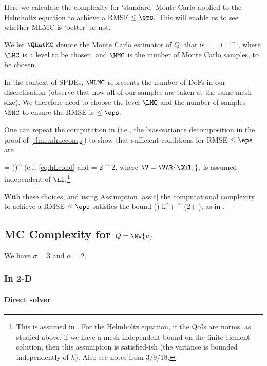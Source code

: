

Here we calculate the complexity for `standard' Monte Carlo applied to the Helmholtz equation to achieve a RMSE $\leq \eps.$ This will enable us to see whether MLMC is `better' or not.

We let $\QhatMC$ denote the Monte Carlo estimator of $Q$, that is
\beqs
\QhatMC =  \sum_{i=1}^{\NMC} \QMLMC,
\eeqs
where $\LMC$ is a level to be chosen, and $\NMC$ is the number of Monte Carlo samples, to be chosen.

In the context of SPDEs, $\MLMC$ represents the number of DoFs in our discretisation (observe that now all of our samples are taken at the same mesh size). We therefore need to choose the level $\LMC$ and the number of samples $\NMC$ to ensure the RMSE is $\leq \eps.$

One can repeat the computation in \cite[Section 2.1]{ClGiScTe:11} (i.e., the bias-variance decomposition in the proof of \cref{thm:mlmccomp}) to show that sufficient conditions for RMSE $\leq \eps$ are

\beq\label{eq:mch}
\hLMC = \mleft(\mright)^{\alpha}
\eeq
(c.f. \eqref{eq:hLcond} and
\beqs
\NMC = 2 \V \eps^{-2},
\eeqs
where $\V = \VAR{\Qhl,},$ is assumed independent of $\hl.$\footnote{This is assumed in \cite[Section 2.1]{ClGiScTe:11}. For the Helmholtz equation, if the QoIs are norms, as studied above, if we have a mesh-independent bound on the finite-element solution, then this assumption is satisfied-ish (the variance is bounded independently of $h$). Also see notes from 3/9/18.}

With these choices, and using Assumption \eqref{ass:c}  the computational complexity to achieve a RMSE $\leq \eps$ satisfies the bound
\beq\label{eq:mchhcomp1}
\CMC(\eps) \lesssim k^{\rho + \frac{\sigma\gamma}{\alpha}}\eps^{-\mleft(2+ \frac\gamma\alpha\mright)},
\eeq
as in \cite[Equation before Section 2.2]{ClGiScTe:11}.

\subsection{MC Complexity for $Q=\NW{u}$}

We have $\sigma = 3$ and $\alpha = 2.$

\subsubsection{In 2-D}

\paragraph{Direct solver}

